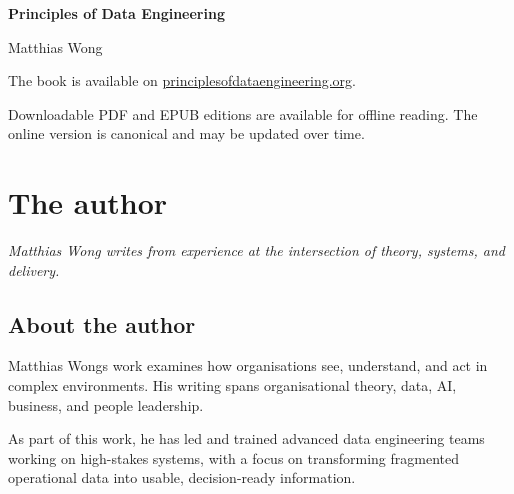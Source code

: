 \documentclass[10pt,openany,10pt]{book}
\begin{document}
\frontmatter

\thispagestyle{empty}

\vspace*{0.25\textheight}

\begin{center}

{\Huge\bfseries Principles of Data Engineering\\}

\vspace{1.5cm}

{\Large Matthias Wong}

\end{center}

\newpage

\thispagestyle{empty}

\vspace*{0.35\textheight}

\noindent The book is available on
\href{https://principlesofdataengineering.org/?utm_source=pde_book}{principlesofdataengineering.org}.

\vspace{1em}

\noindent Downloadable PDF and EPUB editions are available for offline
reading. The online version is canonical and may be updated over time.

\newpage

\tableofcontents

\newpage

\mainmatter

\chapter{The author}\label{docs-about-the-author}

\emph{Matthias Wong writes from experience at the intersection of
theory, systems, and delivery.}

\section{About the author}\label{about-the-author}

Matthias Wong\textquotesingle s work examines how organisations see,
understand, and act in complex environments. His writing spans
organisational theory, data, AI, business, and people leadership.

As part of this work, he has led and trained advanced data engineering
teams working on high-stakes systems, with a focus on transforming
fragmented operational data into usable, decision-ready information.
\end{document}
